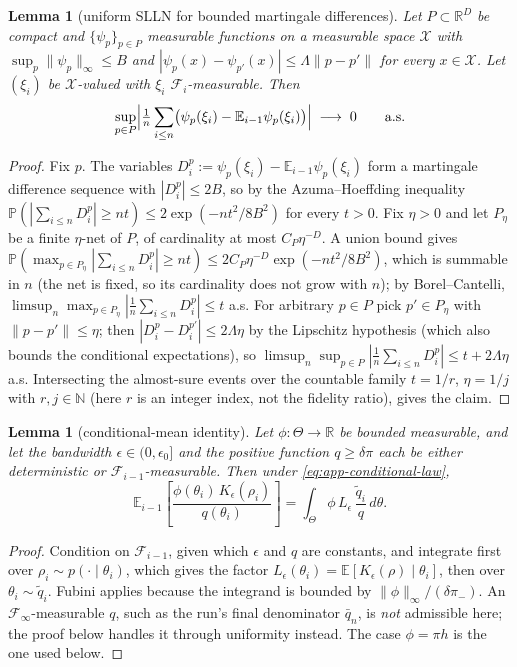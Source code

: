 \documentclass[10pt]{article}
\theoremstyle{plain}
\newtheorem{lemma}[theorem]{Lemma}
\theoremstyle{definition}
\begin{document}
\begin{lemma}[uniform SLLN for bounded martingale differences]\label{lem:uslln}
Let $P\subset\mathbb{R}^{D}$ be compact and $\{\psi_p\}_{p\in P}$ measurable functions on a measurable space $\mathcal{X}$ with $\sup_{p}\|\psi_p\|_\infty\le B$ and $|\psi_p(x)-\psi_{p'}(x)|\le\Lambda\|p-p'\|$ for every $x\in\mathcal{X}$. Let $(\xi_i)$ be $\mathcal{X}$-valued with $\xi_i$ $\mathcal{F}_i$-measurable. Then
\[
\sup_{p\in P}\Bigl|\tfrac1n\sum_{i\le n}\bigl(\psi_p(\xi_i)-\mathbb{E}_{i-1}\psi_p(\xi_i)\bigr)\Bigr|\;\longrightarrow\;0
\qquad\text{a.s.}
\]
\end{lemma}
\begin{proof}
Fix $p$. The variables $D^p_i:=\psi_p(\xi_i)-\mathbb{E}_{i-1}\psi_p(\xi_i)$ form a martingale difference sequence with $|D^p_i|\le2B$, so by the Azuma--Hoeffding inequality $\mathbb{P}(|\sum_{i\le n}D^p_i|\ge nt)\le2\exp(-nt^2/8B^2)$ for every $t>0$. Fix $\eta>0$ and let $P_\eta$ be a finite $\eta$-net of $P$, of cardinality at most $C_P\eta^{-D}$. A union bound gives $\mathbb{P}(\max_{p\in P_\eta}|\sum_{i\le n}D^p_i|\ge nt)\le2C_P\eta^{-D}\exp(-nt^2/8B^2)$, which is summable in $n$ (the net is fixed, so its cardinality does not grow with $n$); by Borel--Cantelli, $\limsup_n\max_{p\in P_\eta}|\tfrac1n\sum_{i\le n}D^p_i|\le t$ a.s. For arbitrary $p\in P$ pick $p'\in P_\eta$ with $\|p-p'\|\le\eta$; then $|D^p_i-D^{p'}_i|\le2\Lambda\eta$ by the Lipschitz hypothesis (which also bounds the conditional expectations), so $\limsup_n\sup_{p\in P}|\tfrac1n\sum_{i\le n}D^p_i|\le t+2\Lambda\eta$ a.s. Intersecting the almost-sure events over the countable family $t=1/r$, $\eta=1/j$ with $r,j\in\mathbb{N}$ (here $r$ is an integer index, not the fidelity ratio), gives the claim.
\end{proof}

\begin{lemma}[conditional-mean identity]\label{lem:condmean}
Let $\phi:\Theta\to\mathbb{R}$ be bounded measurable, and let the bandwidth $\epsilon\in(0,\epsilon_0]$ and the positive function $q\ge\delta\pi$ each be either deterministic or $\mathcal{F}_{i-1}$-measurable. Then under \eqref{eq:app-conditional-law},
\[
\mathbb{E}_{i-1}\!\left[\frac{\phi(\theta_i)\,K_\epsilon(\rho_i)}{q(\theta_i)}\right]
=\int_\Theta \phi\,L_\epsilon\,\frac{\tilde q_i}{q}\,d\theta .
\]
\end{lemma}
\begin{proof}
Condition on $\mathcal{F}_{i-1}$, given which $\epsilon$ and $q$ are constants, and integrate first over $\rho_i\sim p(\cdot\mid\theta_i)$, which gives the factor $L_\epsilon(\theta_i)=\mathbb{E}[K_\epsilon(\rho)\mid\theta_i]$, then over $\theta_i\sim\tilde q_i$. Fubini applies because the integrand is bounded by $\|\phi\|_\infty/(\delta\pi_-)$. An $\mathcal{F}_\infty$-measurable $q$, such as the run's final denominator $\bar q_n$, is \emph{not} admissible here; the proof below handles it through uniformity instead. The case $\phi=\pi h$ is the one used below.
\end{proof}
\end{document}
